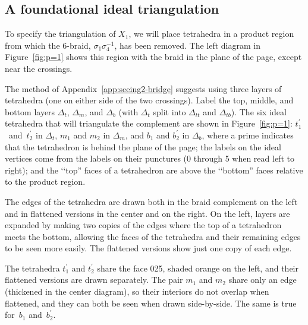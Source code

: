 \documentclass[reqno]{amsart}
\theoremstyle{plain}
\theoremstyle{definition}
\begin{document}
\subsection{A foundational ideal triangulation}   \label{sec:p=1}

To specify the triangulation of $X_{1}$, we will place tetrahedra in a product region from which the 6-braid, $\sigma_1\sigma_4^{-1}$, has been removed.   The left diagram in Figure~\ref{fig:p=1} shows this region with the braid in the plane of the page, except near the crossings.  

The method of Appendix~\ref{app:seeing2-bridge} suggests using three layers of tetrahedra (one on either side of the two crossings).  Label the top, middle, and bottom layers $\Delta_t$, $\Delta_m$, and $\Delta_b$ (with $\Delta_t$ split into $\Delta_{tt}$ and $\Delta_{tb}$).  The six ideal tetrahedra that will triangulate the complement are shown in Figure~\ref{fig:p=1}:  $t_1^\prime$~and~$t_2^\prime$ in $\Delta_t$, $m_1$ and $m_2$ in $\Delta_m$, and $b_1$ and $b_2^\prime$ in $\Delta_b$, where a prime indicates that the tetrahedron is behind the plane of the page; the labels on the ideal vertices come from the labels on their punctures (0 through 5 when read left to right); and the \lq\lq top'' faces of a tetrahedron are above the \lq\lq bottom'' faces relative to the product region.  

The edges of the tetrahedra are drawn both in the braid complement on the left and in flattened versions in the center and on the right.  On the left,  layers are expanded by making two copies of the edges where the top of a tetrahedron meets the bottom, allowing the faces of the tetrahedra and their remaining edges to be seen more easily.  The flattened versions show just one copy of each edge. 

The tetrahedra $t_1^\prime$ and $t_2^\prime$ share the face 025, shaded orange on the left, and their flattened versions are drawn separately.  The pair $m_1$ and $m_2$ share only an edge (thickened in the center diagram), so their interiors do not overlap when flattened, and they can both be seen when drawn side-by-side.  The same is true for~$b_1$ and~$b_2^\prime$.
\end{document}
